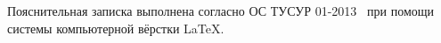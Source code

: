 
Пояснительная записка выполнена согласно ОС ТУСУР 01-2013~\cite{ostusur} при помощи системы компьютерной вёрстки \LaTeX. 
